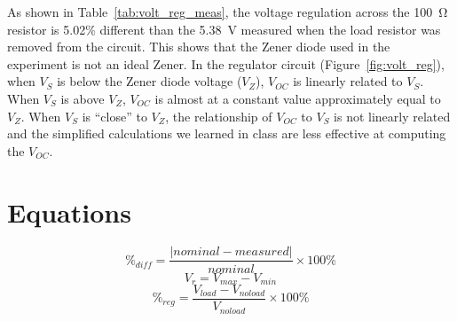 \documentclass{article}
\begin{document}
As shown in Table~\ref{tab:volt_reg_meas}, the voltage regulation across the \SI{100}{\ohm} resistor is 5.02\% different than the \SI{5.38}{V} measured when the load resistor was removed from the circuit.  This shows that the Zener diode used in the experiment is not an ideal Zener.  In the regulator circuit (Figure~\ref{fig:volt_reg}), when $V_S$ is below the Zener diode voltage ($V_Z$), $V_{OC}$ is linearly related to $V_S$.  When $V_S$ is above $V_Z$, $V_{OC}$ is almost at a constant value approximately equal to $V_Z$.  When $V_S$ is “close” to $V_Z$, the relationship of $V_{OC}$ to $V_S$ is not linearly related and the simplified calculations we learned in class are less effective at computing the $V_{OC}$.

%





\section{Equations}
\label{sec:equations}

%
\begin{equation}
  \label{eq:percent_diff}
  \%_{diff} = \frac{|nominal - measured|}{nominal}\times 100\%
\end{equation}
%
\begin{equation}
  \label{eq:ripple}
  V_r = V_{max} - V_{min}
\end{equation}
%
\begin{equation}
  \label{eq:volt_reg}
  \%_{reg} = \frac{V_{load} - V_{no load}}{V_{no load}}\times 100\%
\end{equation}
\end{document}
